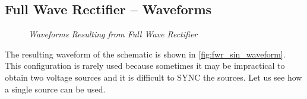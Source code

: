 		\subsection{Full Wave Rectifier – Waveforms}
			\begin{figure}[ht]
				\centering 
				\vfill
				\label{fig:fwr_waveform_wholeDiagram}
				\caption{\textit{Waveforms Resulting from Full Wave Rectifier}}
			\end{figure}
			The resulting waveform of the schematic is shown  in \ref{fig:fwr_sin_waveform}. This configuration is rarely used because sometimes it may be impractical to obtain two voltage sources and it is difficult to SYNC the sources. Let us see how a single source can be used.
		
